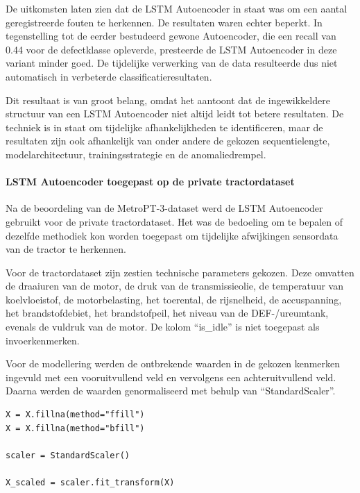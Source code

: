 {{{{De uitkomsten laten zien dat de LSTM Autoencoder in staat was om een aantal geregistreerde fouten te herkennen. De resultaten waren echter beperkt. In tegenstelling tot de eerder bestudeerd gewone Autoencoder, die een recall van 0.44 voor de defectklasse opleverde, presteerde de LSTM Autoencoder in deze variant minder goed. De tijdelijke verwerking van de data resulteerde dus niet automatisch in verbeterde classificatieresultaten.

Dit resultaat is van groot belang, omdat het aantoont dat de ingewikkeldere structuur van een LSTM Autoencoder niet altijd leidt tot betere resultaten. De techniek is in staat om tijdelijke afhankelijkheden te identificeren, maar de resultaten zijn ook afhankelijk van  onder andere de gekozen sequentielengte, modelarchitectuur, trainingsstrategie en de anomaliedrempel.

\paragraph{LSTM Autoencoder toegepast op de private tractordataset}

Na de beoordeling van de MetroPT-3-dataset werd de LSTM Autoencoder gebruikt voor de private tractordataset. Het was de bedoeling om te bepalen of dezelfde methodiek kon worden toegepast om tijdelijke afwijkingen sensordata van de tractor te herkennen.

Voor de tractordataset zijn zestien technische parameters gekozen. Deze omvatten de draaiuren van de motor, de druk van de transmissieolie, de temperatuur van koelvloeistof, de motorbelasting, het toerental, de rijsnelheid, de accuspanning, het brandstofdebiet, het brandstofpeil, het niveau van de DEF-/ureumtank, evenals de vuldruk van de motor. De kolom ``is\_idle'' is niet toegepast als invoerkenmerken.

Voor de modellering werden de ontbrekende waarden in de gekozen kenmerken ingevuld met een vooruitvullend veld en vervolgens een achteruitvullend veld. Daar\-na werden de waarden genormaliseerd met behulp van ``StandardScaler''.

\begin{listing}[H]
\begin{verbatim}
X = X.fillna(method="ffill")
X = X.fillna(method="bfill")

scaler = StandardScaler()

X_scaled = scaler.fit_transform(X)
\end{verbatim}
\caption[Code snippet: gedeelte van preprocessing van tractordata voor het toepassen van LSTM Autoencoder]{Codefragment van een gedeelte van de preprocessing van de tractordata voor het toepassen van LSTM Autoencoder.}
\end{listing}

}}}}
